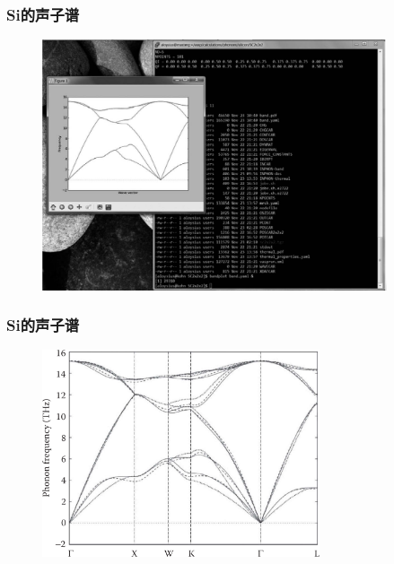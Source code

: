 \frame
{
	\frametitle{\textrm{Si}的声子谱}
\begin{figure}[h!]
\centering
\includegraphics[width=4.0in,viewport=0 0 1050 650,clip]{Figures/Si_pop-out_screen.png}
\caption{\fontsize{6.2pt}{5.2pt}}%
\label{Fig:Si_pop-out_screen}
\end{figure}
}

\frame
{
	\frametitle{\textrm{Si}的声子谱}
\begin{figure}[h!]
	\vskip -12pt
\centering
\includegraphics[height=2.4in,viewport=0 0 780 600,clip]{Figures/Si_phonon}
\caption{\fontsize{6.2pt}{5.2pt}}%
\label{Fig:Si_phonon}
\end{figure}
{\fontsize{7.2pt}{5.2pt}\selectfont{有了声子谱的基本数据，就可以估计晶体的熵、自由能和热膨胀等热力学数据}}%
}

